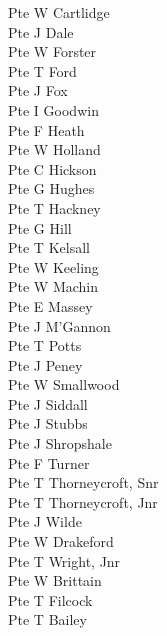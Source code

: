\begin{multicols}{3}
  Pte W Cartlidge \\
  Pte J Dale \\
  Pte W Forster \\
  Pte T Ford \\
  Pte J Fox \\
  Pte I Goodwin \\
  Pte F Heath \\
  Pte W Holland \\
  Pte C Hickson \\
  Pte G Hughes \\
  Pte T Hackney \\
  Pte G Hill \\
  Pte T Kelsall \\
  Pte W Keeling \\
  Pte W Machin \\
  Pte E Massey \\
  Pte J M'Gannon \\
  Pte T Potts \\
  Pte J Peney \\
  Pte W Smallwood \\
  Pte J Siddall \\
  Pte J Stubbs \\
  Pte J Shropshale \\
  Pte F Turner \\
  Pte T Thorneycroft, Snr \\
  Pte T Thorneycroft, Jnr \\
  Pte J Wilde \\
  Pte W Drakeford \\
  Pte T Wright, Jnr \\
  Pte W Brittain \\
  Pte T Filcock \\
  Pte T Bailey \\
\end{multicols}
